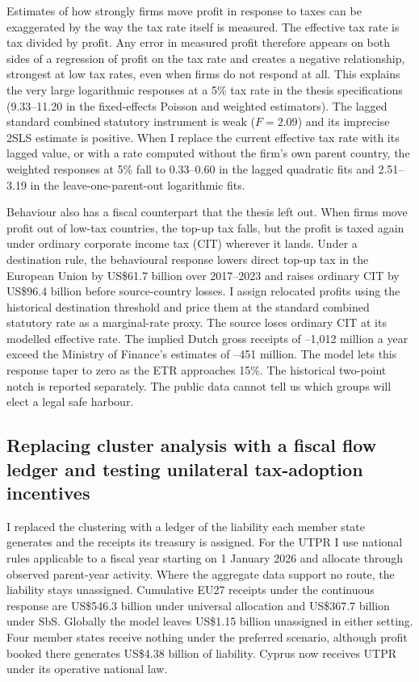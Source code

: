 \documentclass[11pt,a4paper]{article}
\newcommand{\EUR}{\texteuro}
\newcommand{\usd}{US\$}
\begin{document}
Estimates of how strongly firms move profit in response to taxes can be exaggerated by the way the tax rate itself is measured. The effective tax rate is tax divided by profit. Any error in measured profit therefore appears on both sides of a regression of profit on the tax rate and creates a negative relationship, strongest at low tax rates, even when firms do not respond at all. This explains the very large logarithmic responses at a 5\% tax rate in the thesis specifications (9.33–11.20 in the fixed-effects Poisson and weighted estimators). The lagged standard combined statutory instrument is weak ($F=2.09$) and its imprecise 2SLS estimate is positive. When I replace the current effective tax rate with its lagged value, or with a rate computed without the firm's own parent country, the weighted responses at 5\% fall to 0.33–0.60 in the lagged quadratic fits and 2.51–3.19 in the leave-one-parent-out logarithmic fits.

Behaviour also has a fiscal counterpart that the thesis left out. When firms move profit out of low-tax countries, the top-up tax falls, but the profit is taxed again under ordinary corporate income tax (CIT) wherever it lands. Under a destination rule, the behavioural response lowers direct top-up tax in the European Union by \usd61.7 billion over 2017–2023 and raises ordinary CIT by \usd96.4 billion before source-country losses. I assign relocated profits using the historical destination threshold and price them at the standard combined statutory rate as a marginal-rate proxy. The source loses ordinary CIT at its modelled effective rate. The implied Dutch gross receipts of \EUR628–1,012 million a year exceed the Ministry of Finance's estimates of \EUR397–451 million. The model lets this response taper to zero as the ETR approaches 15\%. The historical two-point notch is reported separately. The public data cannot tell us which groups will elect a legal safe harbour.

\subsection{Replacing cluster analysis with a fiscal flow ledger and testing unilateral tax-adoption incentives}

I replaced the clustering with a ledger of the liability each member state generates and the receipts its treasury is assigned. For the UTPR I use national rules applicable to a fiscal year starting on 1 January 2026 and allocate through observed parent-year activity. Where the aggregate data support no route, the liability stays unassigned. Cumulative EU27 receipts under the continuous response are \usd546.3 billion under universal allocation and \usd367.7 billion under SbS. Globally the model leaves \usd1.15 billion unassigned in either setting. Four member states receive nothing under the preferred scenario, although profit booked there generates \usd4.38 billion of liability. Cyprus now receives UTPR under its operative national law.
\end{document}
